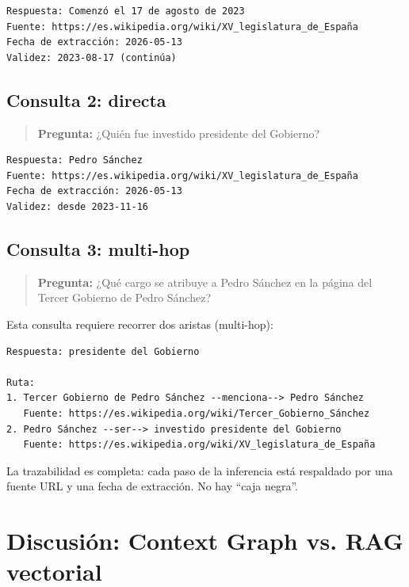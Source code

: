 \documentclass[12pt,a4paper]{article}
\begin{document}
\begin{lstlisting}
Respuesta: Comenzó el 17 de agosto de 2023
Fuente: https://es.wikipedia.org/wiki/XV_legislatura_de_España
Fecha de extracción: 2026-05-13
Validez: 2023-08-17 (continúa)
\end{lstlisting}

\subsection{Consulta 2: directa}
\label{q2}

\begin{quote}
\textbf{Pregunta:} ¿Quién fue investido presidente del Gobierno?
\end{quote}

\begin{lstlisting}
Respuesta: Pedro Sánchez
Fuente: https://es.wikipedia.org/wiki/XV_legislatura_de_España
Fecha de extracción: 2026-05-13
Validez: desde 2023-11-16
\end{lstlisting}

\subsection{Consulta 3: multi-hop}
\label{q3}

\begin{quote}
\textbf{Pregunta:} ¿Qué cargo se atribuye a Pedro Sánchez en la página del Tercer Gobierno de Pedro Sánchez?
\end{quote}

Esta consulta requiere recorrer dos aristas (multi-hop):

\begin{lstlisting}
Respuesta: presidente del Gobierno

Ruta:
1. Tercer Gobierno de Pedro Sánchez --menciona--> Pedro Sánchez
   Fuente: https://es.wikipedia.org/wiki/Tercer_Gobierno_Sánchez
2. Pedro Sánchez --ser--> investido presidente del Gobierno
   Fuente: https://es.wikipedia.org/wiki/XV_legislatura_de_España
\end{lstlisting}

La trazabilidad es completa: cada paso de la inferencia está respaldado por una fuente URL y una fecha de extracción. No hay ``caja negra''.

\section{Discusión: Context Graph vs. RAG vectorial}
\label{sec:discusion}
\end{document}
